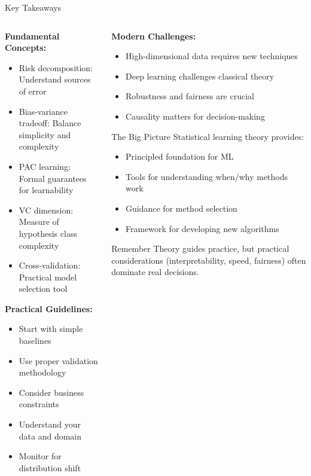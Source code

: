 \documentclass[aspectratio=169,11pt]{beamer}
\begin{document}
\begin{frame}{Key Takeaways}
\begin{columns}
\begin{column}{0.5\textwidth}
\textbf{Fundamental Concepts:}
\begin{itemize}
\item \textcolor{forest}{Risk decomposition}: Understand sources of error
\item \textcolor{forest}{Bias-variance tradeoff}: Balance simplicity and complexity
\item \textcolor{forest}{PAC learning}: Formal guarantees for learnability
\item \textcolor{forest}{VC dimension}: Measure of hypothesis class complexity
\item \textcolor{forest}{Cross-validation}: Practical model selection tool
\end{itemize}

\vspace{0.3cm}
\textbf{Practical Guidelines:}
\begin{itemize}
\item Start with simple baselines
\item Use proper validation methodology
\item Consider business constraints
\item Understand your data and domain
\item Monitor for distribution shift
\end{itemize}
\end{column}
\begin{column}{0.5\textwidth}
\textbf{Modern Challenges:}
\begin{itemize}
\item High-dimensional data requires new techniques
\item Deep learning challenges classical theory
\item Robustness and fairness are crucial
\item Causality matters for decision-making
\end{itemize}

\vspace{0.3cm}
\begin{block}{The Big Picture}
Statistical learning theory provides:
\begin{itemize}
\item Principled foundation for ML
\item Tools for understanding when/why methods work
\item Guidance for method selection
\item Framework for developing new algorithms
\end{itemize}
\end{block}

\begin{alertblock}{Remember}
Theory guides practice, but practical considerations (interpretability, speed, fairness) often dominate real decisions.
\end{alertblock}
\end{column}
\end{columns}
\end{frame}
\end{document}
